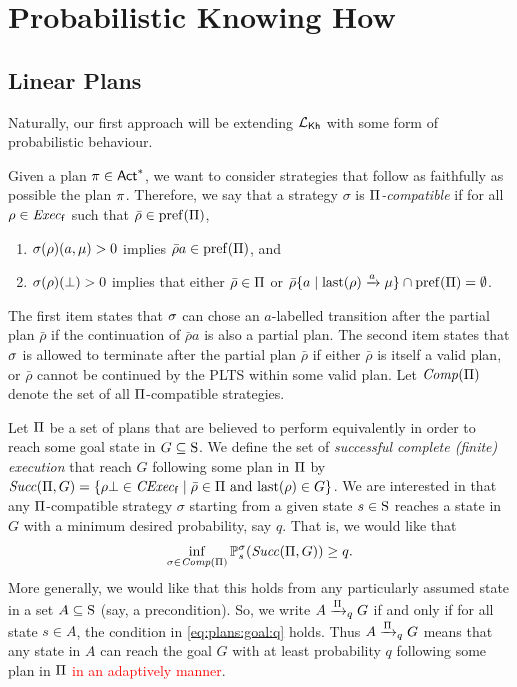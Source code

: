 \section{Probabilistic Knowing How}

\subsection{Linear Plans}

Naturally, our first approach will be extending $\Khlogic$ with some
form of probabilistic behaviour.

Given a plan $\plan\in\Act^*$, we want to consider
strategies that follow as faithfully as possible the plan
$\plan$.  Therefore, we say that a strategy $\sigma$ is
\emph{$\plans$-compatible} if for all $\rho\in\execf$ such that
$\bar{\rho}\in\pref(\plans)$,
%
\begin{enumerate}
\item%
  $\strat(\rho)(a,\mu)>0$ implies $\bar{\rho}a\in\pref(\plans)$, and
\item%
  $\strat(\rho)(\complete)>0$ implies that either
  $\bar{\rho}\in\plans$ or
  $\bar{\rho}\{a\mid{\last(\rho)\reach{a}\mu}\}\cap\pref(\plans) = \emptyset$. 
\end{enumerate}
%
The first item states that $\strat$ can chose an $a$-labelled
transition after the partial plan $\bar{\rho}$ if the continuation of
$\bar{\rho}a$ is also a partial plan.
%
The second item states that $\strat$ is allowed to terminate after the
partial plan $\bar{\rho}$ if either $\bar{\rho}$ is itself a valid
plan, or $\bar{\rho}$ cannot be continued by the PLTS within some
valid plan.
%
Let $\Comp(\plans)$ denote the set of all $\plans$-compatible
strategies.
%


Let $\plans$ be a set of plans that are believed to perform
equivalently in order to reach some goal state in $G\subseteq\S$.  We
define the set of \emph{successful complete (finite) execution} that
reach $G$ following some plan in $\plans$ by
$\Succ(\plans,G)=\{{\rho\complete\in\cexecf}\mid{\bar{\rho}\in\plans
  \text{ and } \last(\rho)\in G}\}$.
%
We are interested in that any $\plans$-compatible strategy $\sigma$
starting from a given state $s\in\S$ reaches a state in $G$ with a
minimum desired probability, say $q$.  That is, we would like that
%
\begin{equation}\label{eq:plans:goal:q}
  \inf_{\sigma \in\Comp(\plans)}\Prob^\strat_s(\Succ(\plans,G)) \geq q.
\end{equation}
%
More generally, we would like that this holds from any particularly
assumed state in a set $A\subseteq\S$ (say, a precondition).  So, we
write $A \reach{\plans}_q G$ if and only if for all state $s\in A$,
the condition in \cref{eq:plans:goal:q} holds.
%
Thus $A \reach{\plans}_q G$ means that any state in $A$ can reach the
goal $G$ with at least probability $q$ following some plan in $\plans$
\textcolor{red}{in an adaptively manner}.




